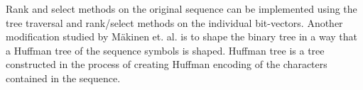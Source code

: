 Rank and select methods on the original sequence can be implemented using the tree
traversal and rank/select methods on the individual bit-vectors. Another modification
studied by M{\"a}kinen et. al.\cite{makinen2005succinct} is to shape the binary tree in a way that a Huffman
tree of the sequence symbols is shaped. Huffman tree is a tree constructed in the
process of creating Huffman encoding of the characters contained in the sequence.